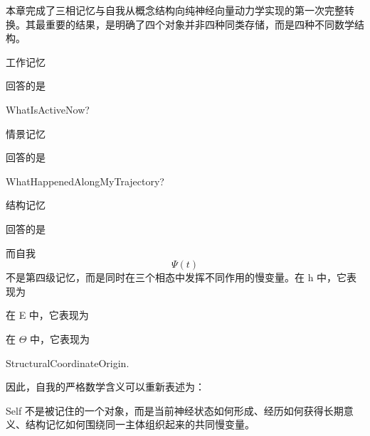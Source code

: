 本章完成了三相记忆与自我从概念结构向纯神经向量动力学实现的第一次完整转换。其最重要的结果，是明确了四个对象并非四种同类存储，而是四种不同数学结构。

工作记忆
\begin{statementbox}
\centering
{}
\end{statementbox}
回答的是
\begin{statementbox}
WhatIsActiveNow?
\end{statementbox}

情景记忆
\begin{statementbox}
\centering
{}
\end{statementbox}
回答的是
\begin{statementbox}
WhatHappenedAlongMyTrajectory?
\end{statementbox}

结构记忆
\begin{statementbox}
\centering
{}
\end{statementbox}
回答的是
\begin{statementbox}
\centering
{}
\end{statementbox}

而自我
\[
\boxed{
\Psi(t)
}
\]
不是第四级记忆，而是同时在三个相态中发挥不同作用的慢变量。在 h 中，它表现为
\begin{statementbox}
\centering
{}
\end{statementbox}
在 E 中，它表现为
\begin{statementbox}
\centering
{}
\end{statementbox}
在 $\Theta$ 中，它表现为
\begin{statementbox}
StructuralCoordinateOrigin.
\end{statementbox}

因此，自我的严格数学含义可以重新表述为：

\begin{statementbox}
Self 不是被记住的一个对象，而是当前神经状态如何形成、经历如何获得长期意义、结构记忆如何围绕同一主体组织起来的共同慢变量。
\end{statementbox}


